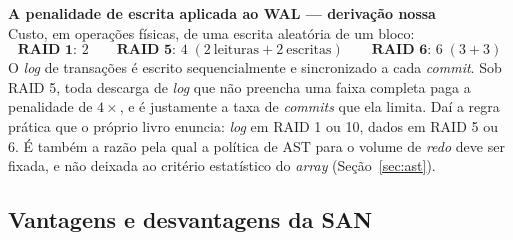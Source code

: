 \documentclass[11pt,a4paper]{article}
\newcommand{\destaque}[2]{%
  \begin{center}\begin{minipage}{0.96\textwidth}
  \colorbox{fundo}{\begin{minipage}{\dimexpr\linewidth-2\fboxsep}
  \vspace{2pt}\textbf{\color{azul}\small #1}\\[1pt]\footnotesize #2\vspace{3pt}
  \end{minipage}}\end{minipage}\end{center}}
\begin{document}
\destaque{A penalidade de escrita aplicada ao WAL --- derivação nossa}{%
Custo, em operações físicas, de uma escrita aleatória de um bloco:
\[
\textbf{RAID 1: } 2 \qquad
\textbf{RAID 5: } 4 \;(2\ \text{leituras} + 2\ \text{escritas}) \qquad
\textbf{RAID 6: } 6 \;(3 + 3)
\]
O \textit{log} de transações é escrito sequencialmente e sincronizado a cada \textit{commit}. Sob
RAID 5, toda descarga de \textit{log} que não preencha uma faixa completa paga a penalidade de
$4\times$, e é justamente a taxa de \textit{commits} que ela limita. Daí a regra prática que o
próprio livro enuncia: \textit{log} em RAID 1 ou 10, dados em RAID 5 ou 6. É também a razão pela qual
a política de AST para o volume de \textit{redo} deve ser fixada, e não deixada ao critério
estatístico do \textit{array} (Seção~\ref{sec:ast}).}


\subsection{Vantagens e desvantagens da SAN}
\label{sec:vantsan}
\end{document}
